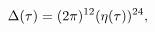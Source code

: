 \[\mathop{\Delta\/}\nolimits\!\left(\tau\right)=(2\pi)^{12}(\mathop{\eta\/}%
\nolimits\!\left(\tau\right))^{24},\]